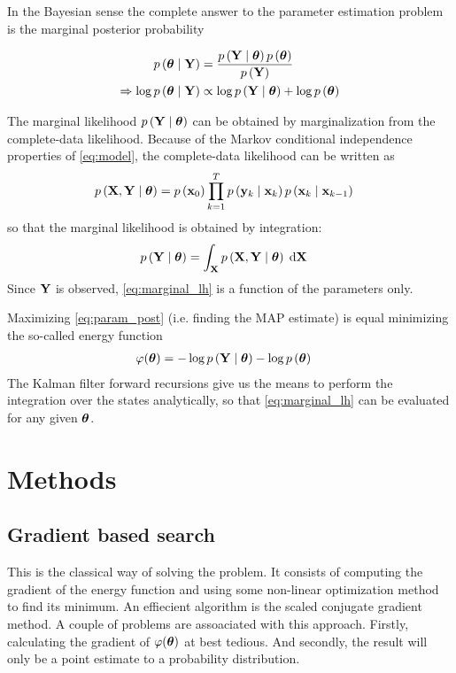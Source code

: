 \documentclass[12pt,a4paper,oneside,article]{memoir}
\begin{document}
In the Bayesian sense the complete answer to the parameter estimation
problem is the marginal posterior
probability

\begin{align}
	\Pdf{\gv{\theta}}{\v{Y}}&=\frac{\Pdf{\v{Y}}{\gv{\theta}}\Pdf{\gv{\theta}}}{\Pdf{\v{Y}}}\\
	\Rightarrow \log\Pdf{\gv{\theta}}{\v{Y}}&\propto \log \Pdf{\v{Y}}{\gv{\theta}} + \log\Pdf{\gv{\theta}}
	\label{eq:param_post}
\end{align}

The marginal likelihood $\Pdf{\v{Y}}{\gv{\theta}}$ can be obtained by
marginalization from the complete-data likelihood. Because of the
Markov conditional independence properties of \eqref{eq:model},
the complete-data likelihood can be written as
\begin{align}
	\Pdf{\v{X},\v{Y}}{\gv{\theta}}&=\Pdf{\v{x}_0}\prod_{k=1}^T\Pdf{\v{y}_k}{\v{x}_{k}}\Pdf{\v{x}_k}{\v{x}_{k-1}}
	\label{eq:complete_data_lh}
\end{align}
so that the marginal likelihood is obtained by integration:
\begin{align}
	\Pdf{\v{Y}}{\gv{\theta}}&=\defint{\v{X}}{}{\Pdf{\v{X},\v{Y}}{\gv{\theta}}}{\v{X}}
	\label{eq:marginal_lh}
\end{align}
Since $\mathbf{Y}$ is observed, \eqref{eq:marginal_lh} is a function of the
parameters only.

Maximizing \eqref{eq:param_post} (i.e. finding the MAP estimate) is equal
minimizing the so-called energy function
\begin{align}
	\varphi(\gv{\theta})&=-\log\Pdf{\v{Y}}{\gv{\theta}}-\log\Pdf{\gv{\theta}}
	\label{eq:energyf}
\end{align}
The Kalman filter forward recursions give us the means to perform
the integration over the states analytically, so that \eqref{eq:marginal_lh}
can be evaluated for any given $\boldsymbol{\theta}$.

\section{Methods}

\subsection{Gradient based search}

This is the classical way of solving the problem. It consists
of computing the gradient of the energy function and using some
non-linear optimization method to find its minimum. An effiecient
algorithm is the scaled conjugate gradient method. A couple of problems
are assoaciated with this approach. Firstly, calculating the gradient
of $\varphi(\boldsymbol{\theta})$ at best tedious. And secondly, the result will
only be a point estimate to a probability distribution.
\end{document}
